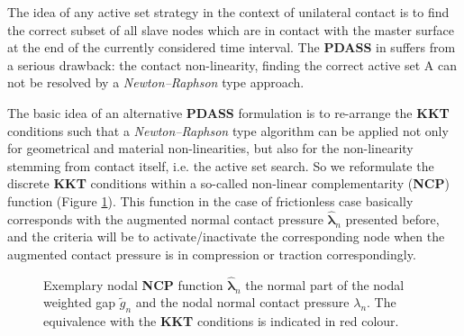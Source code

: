 \documentclass[a4paper,10pt]{article} %
\begin{document}
The idea of any active set strategy in the context of unilateral contact is to find the correct subset of all slave nodes which are in contact with the master surface at the end of the currently considered time interval. The \textbf{PDASS} in  suffers from a serious drawback: the contact non-linearity, finding the correct active set A can not be resolved by a \textit{Newton–Raphson} type approach. 

The basic idea of an alternative \textbf{PDASS} formulation is to re-arrange the \textbf{KKT} conditions such that a \textit{Newton–Raphson} type algorithm can be applied not only for geometrical and material non-linearities, but also for the non-linearity stemming from contact itself, i.e. the active set search. So we reformulate the discrete \textbf{KKT} conditions within a so-called non-linear complementarity (\textbf{NCP}) function (Figure \ref{fig:ncp}). This function in the case of frictionless case basically corresponds with the augmented normal contact pressure $\hat{\boldsymbol{\lambda}}_n$ presented before, and the criteria will be to activate/inactivate the corresponding node when the augmented contact pressure is in compression or traction correspondingly. 

\begin{figure}[h]
\begin{center}
\caption{Exemplary nodal \textbf{NCP} function $\hat{\boldsymbol{\lambda}}_n$ the normal part of the nodal weighted
gap $\tilde{g}_n$ and the nodal normal contact pressure $\lambda_n$. The equivalence with the \textbf{KKT} conditions is indicated in red colour.
}
\label{fig:ncp}
\end{center}
\end{figure}
\end{document}
